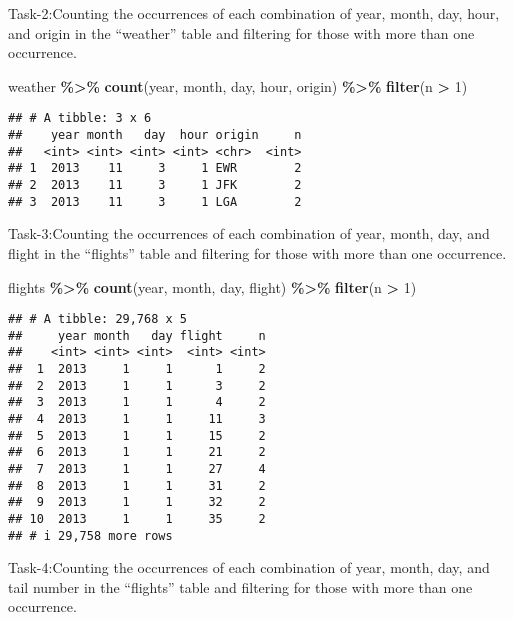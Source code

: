 \documentclass[
]{article}
\newenvironment{Shaded}{\begin{snugshade}}{\end{snugshade}}
\newcommand{\DecValTok}[1]{\textcolor[rgb]{0.00,0.00,0.81}{#1}}
\newcommand{\FunctionTok}[1]{\textcolor[rgb]{0.13,0.29,0.53}{\textbf{#1}}}
\newcommand{\NormalTok}[1]{#1}
\newcommand{\SpecialCharTok}[1]{\textcolor[rgb]{0.81,0.36,0.00}{\textbf{#1}}}
\begin{document}
Task-2:Counting the occurrences of each combination of year, month, day,
hour, and origin in the ``weather'' table and filtering for those with
more than one occurrence.

\begin{Shaded}
\begin{Highlighting}[]
\NormalTok{weather }\SpecialCharTok{\%\textgreater{}\%} 
  \FunctionTok{count}\NormalTok{(year, month, day, hour, origin) }\SpecialCharTok{\%\textgreater{}\%} 
  \FunctionTok{filter}\NormalTok{(n }\SpecialCharTok{\textgreater{}} \DecValTok{1}\NormalTok{)}
\end{Highlighting}
\end{Shaded}

\begin{verbatim}
## # A tibble: 3 x 6
##    year month   day  hour origin     n
##   <int> <int> <int> <int> <chr>  <int>
## 1  2013    11     3     1 EWR        2
## 2  2013    11     3     1 JFK        2
## 3  2013    11     3     1 LGA        2
\end{verbatim}

Task-3:Counting the occurrences of each combination of year, month, day,
and flight in the ``flights'' table and filtering for those with more
than one occurrence.

\begin{Shaded}
\begin{Highlighting}[]
\NormalTok{flights }\SpecialCharTok{\%\textgreater{}\%} 
  \FunctionTok{count}\NormalTok{(year, month, day, flight) }\SpecialCharTok{\%\textgreater{}\%} 
  \FunctionTok{filter}\NormalTok{(n }\SpecialCharTok{\textgreater{}} \DecValTok{1}\NormalTok{)}
\end{Highlighting}
\end{Shaded}

\begin{verbatim}
## # A tibble: 29,768 x 5
##     year month   day flight     n
##    <int> <int> <int>  <int> <int>
##  1  2013     1     1      1     2
##  2  2013     1     1      3     2
##  3  2013     1     1      4     2
##  4  2013     1     1     11     3
##  5  2013     1     1     15     2
##  6  2013     1     1     21     2
##  7  2013     1     1     27     4
##  8  2013     1     1     31     2
##  9  2013     1     1     32     2
## 10  2013     1     1     35     2
## # i 29,758 more rows
\end{verbatim}

Task-4:Counting the occurrences of each combination of year, month, day,
and tail number in the ``flights'' table and filtering for those with
more than one occurrence.
\end{document}
